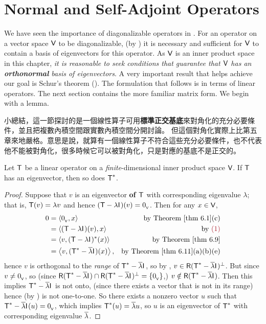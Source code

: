 \section{Normal and Self-Adjoint Operators} \label{sec 6.4}

We have seen the importance of diagonalizable operators in .
For an operator on a vector space \(\textsf{V}\) to be diagonalizable, (by ) it is necessary and sufficient for \(\textsf{V}\) to contain a basis of eigenvectors for this operator.
As \(\textsf{V}\) is an inner product space in this chapter, \emph{it is reasonable to seek conditions that guarantee that \(\textsf{V}\) has an \textbf{orthonormal} basis of eigenvectors}.
A very important result that helps achieve our goal is Schur's theorem ().
The formulation that follows is in terms of linear operators.
The next section contains the more familiar matrix form.
We begin with a lemma.

\begin{note}
小總結，這一節探討的是一個線性算子可用\textbf{標準正交基底}來對角化的充分必要條件，並且把複數內積空間跟實數內積空間分開討論。
但這個對角化實際上比第五章來地嚴格。意思是說，就算有一個線性算子不符合這些充分必要條件，也不代表他不能被對角化，很多時候它可以被對角化，只是對應的基底不是正交的。
\end{note}

\begin{lemma} \label{lem 6.4}
Let \(\textsf{T}\) be a linear operator on a \emph{finite}-dimensional inner product
space \(\textsf{V}\).
If \(\textsf{T}\) has an eigenvector, then so does \(\textsf{T}^*\).
\end{lemma}

\begin{proof}
Suppose that \(v\) is an eigenvector \textbf{of \(\textsf{T}\)} with corresponding eigenvalue \(\lambda\);
that is, \(\textsf{T}(v) = \lambda v\) and hence \((\textsf{T} - \lambda\textsf{I}_{_{}})(v) = 0_{_{\textsf{V}}}\). 
Then for any \(x \in \textsf{V}\),
\begin{align*}
    0 & = \LG \OV, x \RG & \text{by \THM{6.1}(c)} \\
      & = \LG (\T - \lambda\ITRAN{})(v), x \RG & \text{by \MAROON{(1)}} \\
      & = \LG v, (\T - \lambda\ITRAN{})^*(x) \RG & \text{by \THM{6.9}} \\
      & = \LG v, (\T^* - \conjugatet{\lambda} \ITRAN{})(x) \RG, & \text{by \THM{6.11}(a)(b)(e)}
\end{align*}
hence \(v\) is orthogonal to the \emph{range} of \(\textsf{T}^* - \overline{\lambda} \textsf{I}_{_{}}\), so by , \(v \in \textsf{R}(\textsf{T}^* - \overline{\lambda} \textsf{I}_{_{}})^{\perp}\).
But since \(v \ne 0_{_{\textsf{V}}}\), so (since \(\textsf{R}(\textsf{T}^* - \overline{\lambda} \textsf{I}_{_{}}) \cap \textsf{R}(\textsf{T}^* - \overline{\lambda} \textsf{I}_{_{}})^{\perp} = \{ 0_{_{\textsf{V}}} \}\),) \(v \notin \textsf{R}(\textsf{T}^* - \overline{\lambda} \textsf{I}_{_{}})\).
Then this implies \(\textsf{T}^* - \overline{\lambda} \textsf{I}_{_{}}\) is not onto, (since there exists a vector that is not in its range) hence (by ) is not one-to-one.
So there exists a nonzero vector \(u\) such that \(\textsf{T}^* - \overline{\lambda} \textsf{I}_{_{}} (u) = 0_{_{\textsf{V}}}\), which implies \(\textsf{T}^*(u) = \overline{\lambda} u\), so \(u\) is an eigenvector of \(\textsf{T}^*\) with corresponding eigenvalue \(\overline{\lambda}\).
\end{proof}

